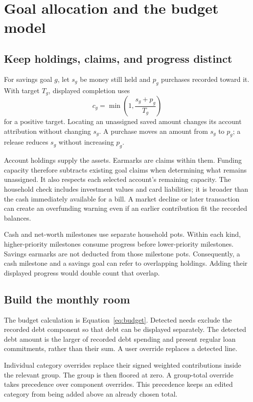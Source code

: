 \chapter{Goal allocation and the budget model}\label{ch:planning-methods}
\section{Keep holdings, claims, and progress distinct}
For savings goal \(g\), let \(s_g\) be money still held and \(p_g\) purchases recorded toward it. With target \(T_g\), displayed completion uses
\[
 c_g=\min\left(1,\frac{s_g+p_g}{T_g}\right)
\]
for a positive target. Locating an unassigned saved amount changes its account attribution without changing \(s_g\). A purchase moves an amount from \(s_g\) to \(p_g\); a release reduces \(s_g\) without increasing \(p_g\).

Account holdings supply the assets. Earmarks are claims within them. Funding capacity therefore subtracts existing goal claims when determining what remains unassigned. It also respects each selected account's remaining capacity. The household check includes investment values and card liabilities; it is broader than the cash immediately available for a bill. A market decline or later transaction can create an overfunding warning even if an earlier contribution fit the recorded balances.

Cash and net-worth milestones use separate household pots. Within each kind, higher-priority milestones consume progress before lower-priority milestones. Savings earmarks are not deducted from those milestone pots. Consequently, a cash milestone and a savings goal can refer to overlapping holdings. Adding their displayed progress would double count that overlap.

\section{Build the monthly room}
The budget calculation is Equation~\eqref{eq:budget}. Detected needs exclude the recorded debt component so that debt can be displayed separately. The detected debt amount is the larger of recorded debt spending and present regular loan commitments, rather than their sum. A user override replaces a detected line.

Individual category overrides replace their signed weighted contributions inside the relevant group. The group is then floored at zero. A group-total override takes precedence over component overrides. This precedence keeps an edited category from being added above an already chosen total.

